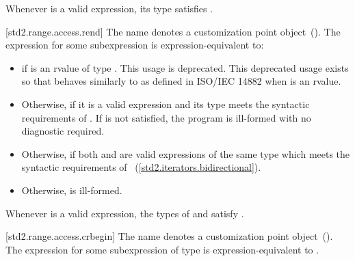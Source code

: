 \pnum
\enternote Whenever  is a valid expression, its
type satisfies . \exitnote

[std2.range.access.rend]{}
\pnum
The name  denotes a customization point
object~(). The expression
 for some subexpression  is expression-equivalent to:

\begin{itemize}
\item
   if  is an rvalue of
  type . This usage is deprecated.
  \enternote This deprecated usage exists so that
   behaves similarly to 
  as defined in ISO/IEC 14882 when  is an rvalue. \exitnote

\item
  Otherwise,  if it is a valid expression and its type  meets the
  syntactic requirements of
  . If
   is not satisfied, the program is ill-formed with
  no diagnostic required.

\item
  Otherwise,  if both
   and  are valid expressions of the same
  type  which meets the syntactic requirements of
  ~(\ref{std2.iterators.bidirectional}).

\item
  Otherwise,  is ill-formed.
\end{itemize}

\pnum
\enternote Whenever  is a valid expression, the
types of  and  satisfy
. \exitnote

[std2.range.access.crbegin]{}
\pnum
The name  denotes a customization point
object~(). The expression
 for some subexpression  of type 
is expression-equivalent to .

